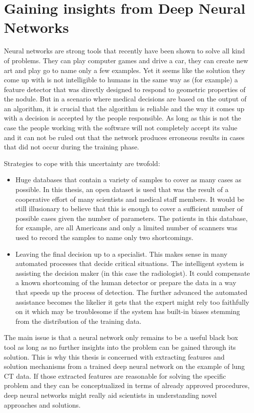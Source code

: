 \documentclass[main.tex]{subfiles}
\begin{document}
\section{Gaining insights from Deep Neural Networks}
Neural networks are strong tools that recently have been shown to solve all kind of problems. They can play computer games and drive a car, they can create new art and play go to name only a few examples. Yet it seems like the solution they come up with is not intelligible to humans in the same way as (for example) a feature detector that was directly designed to respond to geometric properties of the nodule. But in a scenario where medical decisions are based on the output of an algorithm, it is crucial that the algorithm is reliable and the way it comes up with a decision is accepted by the people responsible. As long as this is not the case the people working with the software will not completely accept its value and it can not be ruled out that the network produces erroneous results in cases that did not occur during the training phase.

Strategies to cope with this uncertainty are twofold:
\begin{itemize}
\item Huge databases that contain a variety of samples to cover as many cases as possible. In this thesis, an open dataset is used that was the result of a cooperative effort of many scientists and medical staff members. It would be still illusionary to believe that this is enough to cover a sufficient number of possible cases given the number of parameters. The patients in this database, for example, are all Americans and only a limited number of scanners was used to record the samples to name only two shortcomings.

\item Leaving the final decision up to a specialist. This makes sense in many automated processes that decide critical situations. The intelligent system is assisting the decision maker (in this case the radiologist). It could compensate a known shortcoming of the human detector or prepare the data in a way that speeds up the process of detection. The further advanced the automated assistance becomes the likelier it gets that the expert might rely too faithfully on it which may be troublesome if the system has built-in biases stemming from the distribution of the training data.
\end{itemize}

The main issue is that a neural network only remains to be a useful black box tool as long as no further insights into the problem can be gained through its solution. This is why this thesis is concerned with extracting features and solution mechanisms from a trained deep neural network on the example of lung CT data. If those extracted features are reasonable for solving the specific problem and they can be conceptualized in terms of already approved procedures, deep neural networks might really aid scientists in understanding novel approaches and solutions.
\end{document}
